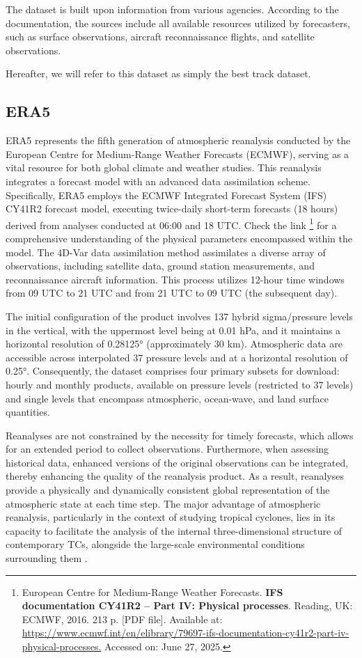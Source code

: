 The dataset is built upon information from various agencies. According to the documentation, the sources include all available resources utilized by forecasters, such as surface observations, aircraft reconnaissance flights, and satellite observations.

Hereafter, we will refer to this dataset as simply the best track dataset.

\subsection{ERA5}

ERA5 represents the fifth generation of atmospheric reanalysis conducted by the European Centre for Medium-Range Weather Forecasts (ECMWF), serving as a vital resource for both global climate and weather studies. This reanalysis integrates a forecast model with an advanced data assimilation scheme. Specifically, ERA5 employs the ECMWF Integrated Forecast System (IFS) CY41R2 forecast model, executing twice-daily short-term forecasts (18 hours) derived from analyses conducted at 06:00 and 18 UTC. Check the link \footnote{European Centre for Medium-Range Weather Forecasts. \textbf{IFS documentation CY41R2 – Part IV: Physical processes}. Reading, UK: ECMWF, 2016. 213 p. [PDF file]. Available at: \url{https://www.ecmwf.int/en/elibrary/79697-ifs-documentation-cy41r2-part-iv-physical-processes.}  Accessed on: June 27, 2025.} for a comprehensive understanding of the physical parameters encompassed within the model. The 4D-Var data assimilation method assimilates a diverse array of observations, including satellite data, ground station measurements, and reconnaissance aircraft information. This process utilizes 12-hour time windows from 09 UTC to 21 UTC and from 21 UTC to 09 UTC (the subsequent day).

The initial configuration of the product involves 137 hybrid sigma/pressure levels in the vertical, with the uppermost level being at 0.01 hPa, and it maintains a horizontal resolution of 0.28125° (approximately 30 km). Atmospheric data are accessible across interpolated 37 pressure levels and at a horizontal resolution of 0.25°. Consequently, the dataset comprises four primary subsets for download: hourly and monthly products, available on pressure levels (restricted to 37 levels) and single levels that encompass atmospheric, ocean-wave, and land surface quantities.

Reanalyses are not constrained by the necessity for timely forecasts, which allows for an extended period to collect observations. Furthermore, when assessing historical data, enhanced versions of the original observations can be integrated, thereby enhancing the quality of the reanalysis product. As a result, reanalyses provide a physically and dynamically consistent global representation of the atmospheric state at each time step. The major advantage of atmospheric reanalysis, particularly in the context of studying tropical cyclones, lies in its capacity to facilitate the analysis of the internal three-dimensional structure of contemporary TCs, alongside the large-scale environmental conditions surrounding them \cite{dulac2024assessing}.

